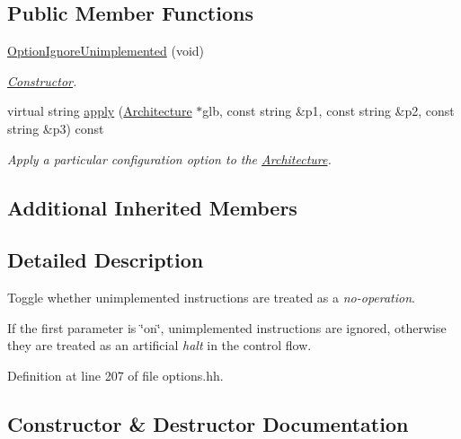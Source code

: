 \subsection*{Public Member Functions}
\begin{DoxyCompactItemize}
\item 
\mbox{\hyperlink{class_option_ignore_unimplemented_ae6e558affb85d4255cd8c016f46f63b0}{Option\+Ignore\+Unimplemented}} (void)
\begin{DoxyCompactList}\small\item\em \mbox{\hyperlink{class_constructor}{Constructor}}. \end{DoxyCompactList}\item 
virtual string \mbox{\hyperlink{class_option_ignore_unimplemented_a459728e7576c3f9f873778201715249d}{apply}} (\mbox{\hyperlink{class_architecture}{Architecture}} $\ast$glb, const string \&p1, const string \&p2, const string \&p3) const
\begin{DoxyCompactList}\small\item\em Apply a particular configuration option to the \mbox{\hyperlink{class_architecture}{Architecture}}. \end{DoxyCompactList}\end{DoxyCompactItemize}
\subsection*{Additional Inherited Members}


\subsection{Detailed Description}
Toggle whether unimplemented instructions are treated as a {\itshape no-\/operation}. 

If the first parameter is \char`\"{}on\char`\"{}, unimplemented instructions are ignored, otherwise they are treated as an artificial {\itshape halt} in the control flow. 

Definition at line 207 of file options.\+hh.



\subsection{Constructor \& Destructor Documentation}
\mbox{\label{class_option_ignore_unimplemented_ae6e558affb85d4255cd8c016f46f63b0}} 
